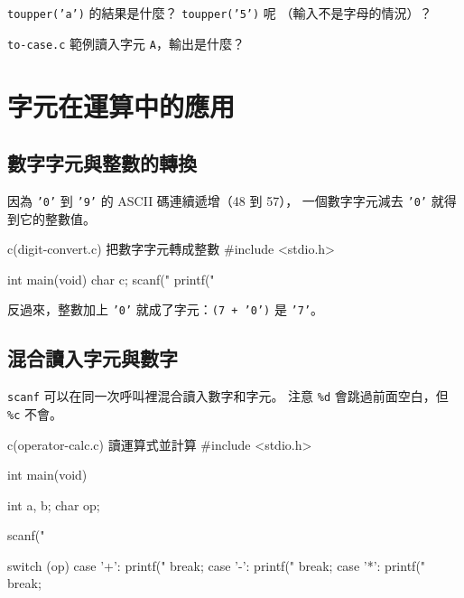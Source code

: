 \begin{drills}[label=drills:char-convert]
\item \texttt{toupper('a')} 的結果是什麼？ \texttt{toupper('5')} 呢
（輸入不是字母的情況）？
\item \texttt{to-case.c} 範例讀入字元 \texttt{A}，輸出是什麼？
\end{drills}

\section{字元在運算中的應用}
\label{sec:char-arithmetic}

\subsection{數字字元與整數的轉換}

因為 \texttt{'0'} 到 \texttt{'9'} 的 ASCII 碼連續遞增（48 到 57），
一個數字字元減去 \texttt{'0'} 就得到它的整數值。

\begin{example}{c}{(digit-convert.c) 把數字字元轉成整數}
#include <stdio.h>

int main(void) {
    char c;
    scanf("%
    printf("%
}
\end{example}


反過來，整數加上 \texttt{'0'} 就成了字元：\texttt{(7 + '0')} 是
\texttt{'7'}。

\subsection{混合讀入字元與數字}

\texttt{scanf} 可以在同一次呼叫裡混合讀入數字和字元。 注意 \texttt{\%d}
會跳過前面空白，但 \texttt{\%c} 不會。

\begin{example}{c}{(operator-calc.c) 讀運算式並計算}
#include <stdio.h>

int main(void) {
    int a, b;
    char op;

    scanf("%

    switch (op) {
        case '+':
            printf("%
            break;
        case '-':
            printf("%
            break;
        case '*':
            printf("%
            break;
    }
}
\end{example}


